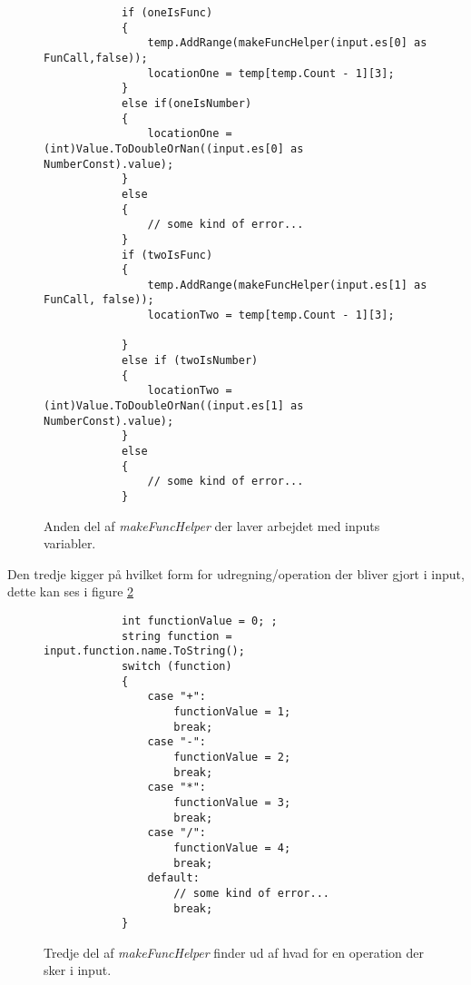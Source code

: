 \begin{figure}[!ht]
    \centering
    \lstset{style=sharpc}
	\begin{lstlisting}
            if (oneIsFunc)
            {
                temp.AddRange(makeFuncHelper(input.es[0] as FunCall,false));
                locationOne = temp[temp.Count - 1][3];
            }
            else if(oneIsNumber)
            {
                locationOne = (int)Value.ToDoubleOrNan((input.es[0] as NumberConst).value);
            }
            else
            {
                // some kind of error...
            }
            if (twoIsFunc)
            {
                temp.AddRange(makeFuncHelper(input.es[1] as FunCall, false));
                locationTwo = temp[temp.Count - 1][3];
               
            }
            else if (twoIsNumber)
            {
                locationTwo = (int)Value.ToDoubleOrNan((input.es[1] as NumberConst).value);
            }
            else
            {
                // some kind of error...
            }
	\end{lstlisting}
    \caption{Anden del af \textit{makeFuncHelper} der laver arbejdet med inputs variabler.}
    \label{fig:makeFuncHelper_part_2}
\end{figure}

Den tredje kigger på hvilket form for udregning/operation der bliver gjort i input, dette kan ses i figure \ref{fig:makeFuncHelper_part_3}

\begin{figure}[!ht]
    \centering
    \lstset{style=sharpc}
	\begin{lstlisting}
            int functionValue = 0; ;
            string function = input.function.name.ToString();
            switch (function)
            {
                case "+":
                    functionValue = 1;
                    break;
                case "-":
                    functionValue = 2;
                    break;
                case "*":
                    functionValue = 3;
                    break;
                case "/":
                    functionValue = 4;
                    break;
                default:
                    // some kind of error...
                    break;
            }
	\end{lstlisting}
    \caption{Tredje del af \textit{makeFuncHelper} finder ud af hvad for en operation der sker i input.}
    \label{fig:makeFuncHelper_part_3}
\end{figure}

